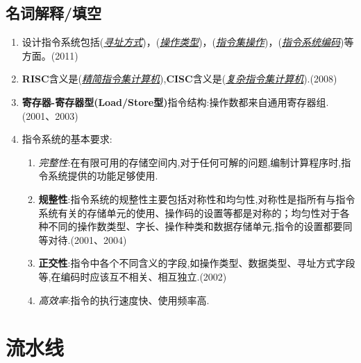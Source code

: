 \documentclass[a4paper]{ctexart}
\newcommand{\blank}[1]{(\emph{\underline{#1}})}
\begin{document}
\subsection{名词解释/填空}
\begin{enumerate}
  \item 设计指令系统包括\blank{寻址方式}，\blank{操作类型}，\blank{指令集操作}，\blank{指令系统编码}等方面。(2011)
  \item \textbf{RISC}含义是\blank{精简指令集计算机},\textbf{CISC}含义是\blank{复杂指令集计算机}.(2008)
  \item \textbf{寄存器-寄存器型(Load/Store型)}指令结构:操作数都来自通用寄存器组.(2001、2003)
  \item 指令系统的基本要求:
  \begin{enumerate}
    \item \emph{完整性}:在有限可用的存储空间内,对于任何可解的问题,编制计算程序时,指令系统提供的功能足够使用.
    \item \textbf{规整性}:指令系统的规整性主要包括对称性和均匀性,对称性是指所有与指令系统有关的存储单元的使用、操作码的设置等都是对称的；均匀性对于各种不同的操作数类型、字长、操作种类和数据存储单元,指令的设置都要同等对待.(2001、2004)
    \item \textbf{正交性}:指令中各个不同含义的字段,如操作类型、数据类型、寻址方式字段等,在编码时应该互不相关、相互独立.(2002)
    \item \emph{高效率}:指令的执行速度快、使用频率高.
  \end{enumerate}

\end{enumerate}

\newpage
\section{流水线}
\end{document}
